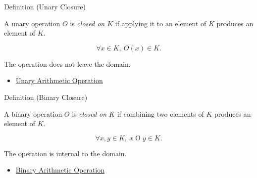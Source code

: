 \begin{definitionbox}{Definition (Unary Closure)}
\begin{definition}
\label{def:unary-closure}
A unary operation $O$ is \emph{closed on $K$} if applying it to an element of
$K$ produces an element of $K$.
\end{definition}

\begin{remark*}
\[
\forall x\in K,\ O(x)\in K.
\]
\end{remark*}

\begin{remark*}[Interpretation]
The operation does not leave the domain.
\end{remark*}

\begin{dependencies}
\begin{itemize}
  \item \hyperref[def:unary-arithmetic-operation]{Unary Arithmetic Operation}
\end{itemize}
\end{dependencies}
\end{definitionbox}

\begin{definitionbox}{Definition (Binary Closure)}
\begin{definition}
\label{def:binary-closure}
A binary operation $O$ is \emph{closed on $K$} if combining two elements of
$K$ produces an element of $K$.
\end{definition}

\begin{remark*}
\[
\forall x,y\in K,\ x\mathbin{O}y\in K.
\]
\end{remark*}

\begin{remark*}[Interpretation]
The operation is internal to the domain.
\end{remark*}

\begin{dependencies}
\begin{itemize}
  \item \hyperref[def:binary-arithmetic-operation]{Binary Arithmetic Operation}
\end{itemize}
\end{dependencies}
\end{definitionbox}

